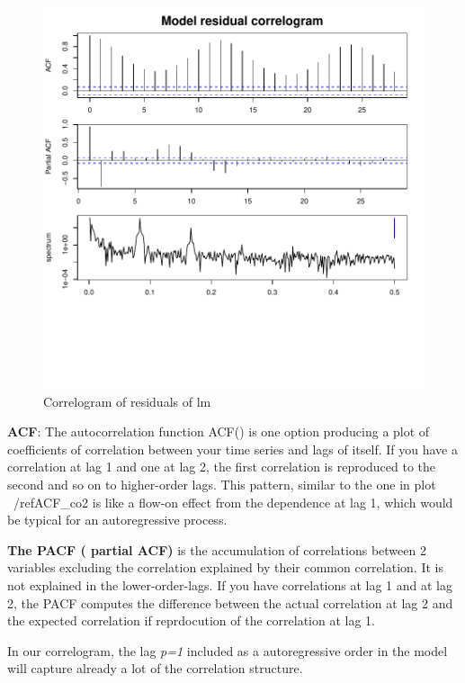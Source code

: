 \documentclass[11pt, a4paper]{article} %
\begin{document}
\begin{figure}[H]
\centering
\includegraphics{alleselena-correlogramres}
\caption{Correlogram of residuals of lm}
\label{correlogramlm}
\end{figure}

\noindent   \textbf{ACF}:  The autocorrelation function ACF() is one option producing a  plot of coefficients of correlation between your time series and lags of itself.   If you have a correlation at lag 1 and one at lag 2, the first correlation is reproduced to the second and so on to higher-order lags. This pattern, similar to the one in plot ~/ref{ACF_co2} is like a flow-on effect from the dependence at lag 1, which would be typical for an autoregressive process. 
	
\textbf{	The PACF ( partial ACF)} is the accumulation of correlations between 2 variables excluding the correlation explained by their common correlation. It is not explained in the lower-order-lags. If you have correlations at lag 1 and at lag 2, the PACF computes the difference between the actual correlation at lag 2 and the expected correlation if reprdocution of the correlation at lag 1. 
	
	In our correlogram, the lag \emph{p=1}  included  as a autoregressive order in the model will capture already a lot of the correlation structure. 
	
\end{document}
